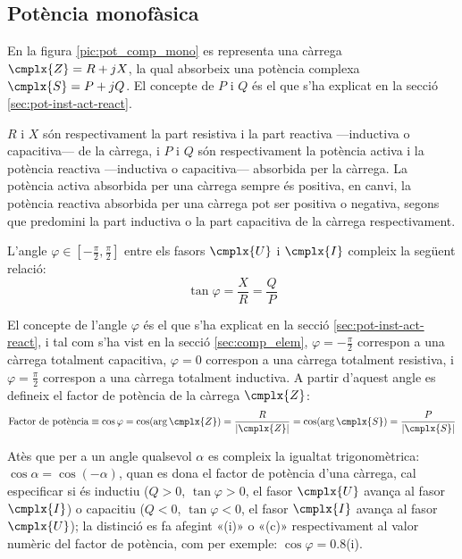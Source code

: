 \subsection{Potència monofàsica} \label{sec:pot-monof}

En la figura \vref{pic:pot_comp_mono} es representa una càrrega $\cmplx{Z}=R+j X$, la
qual absorbeix una potència complexa $\cmplx{S} = P + j Q$. El concepte de $P$ i $Q$ és el  que s'ha explicat en la secció \ref{sec:pot-inst-act-react}.
\begin{center}
    
    \label{pic:pot_comp_mono}
\end{center}

$R$ i $X$ són respectivament la part resistiva i la part reactiva ---inductiva o capacitiva--- de la càrrega, i $P$ i $Q$ són
respectivament la potència activa i la potència reactiva ---inductiva
o capacitiva--- absorbida per la càrrega.
La potència activa absorbida per una càrrega sempre és positiva, en
canvi, la potència reactiva absorbida per una càrrega pot ser
positiva o negativa, segons que predomini la part inductiva o la
part capacitiva de la càrrega respectivament.

L'angle $\varphi\in[-\frac{\pi}{2},\frac{\pi}{2}]$ entre els fasors $\cmplx{U}$ i $\cmplx{I}$ compleix la següent relació:
\begin{equation}
   \tan\varphi = \frac{X}{R} = \frac{Q}{P}
\end{equation}

El concepte de l'angle $\varphi$ és el  que s'ha explicat en la secció \ref{sec:pot-inst-act-react}, i tal com s'ha vist en la secció \ref{sec:comp_elem}, $\varphi = -\frac{\pi}{2}$ correspon a una càrrega totalment capacitiva, $\varphi = 0$ correspon a una càrrega totalment resistiva, i $\varphi = \frac{\pi}{2}$ correspon a una càrrega totalment inductiva. A partir d'aquest angle es
defineix el factor de potència de la càrrega $\cmplx{Z}$:
\begin{equation}
   \text{Factor de potència} \equiv \cos\varphi = \cos (\arg \cmplx{Z}) =
   \frac{R}{|\cmplx{Z}|} =
   \cos (\arg \cmplx{S}) =
   \frac{P}{|\cmplx{S}|}
\end{equation}

Atès que per a un angle qualsevol $\alpha$ es compleix la igualtat
trigonomètrica: $\cos\alpha = \cos(-\alpha)$, quan es dona el factor
de potència d'una càrrega, cal especificar si és inductiu ($Q>0$,
$\tan\varphi>0$, el fasor $\cmplx{U}$ avança al fasor $\cmplx{I}$) o
capacitiu ($Q<0$, $\tan\varphi<0$, el fasor $\cmplx{I}$ avança al fasor $\cmplx{U}$); la distinció es fa
afegint «(i)» o «(c)» respectivament al valor numèric del factor
de potència, com per exemple: $\cos\varphi=\num{0,8}$(i).

